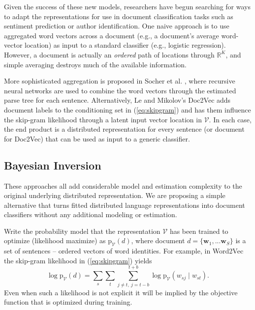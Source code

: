 \documentclass[11pt]{article}
\begin{document}
Given the success of these new models, researchers have begun searching for
ways to adapt the representations for use in document classification tasks
such as sentiment prediction or author identification.  One  naive approach is
to use aggregated word vectors across a document (e.g., a document's average
word-vector location) as input to a standard classifier (e.g.,
logistic regression).  However, a document is actually  an {\it ordered} path
of  locations through $\mathds{R}^K$, and simple averaging destroys much of the available
information.  

More sophisticated aggregation is proposed in Socher et al.
, where recursive neural
networks are used to combine the word vectors through the estimated parse tree
for each sentence.  Alternatively,  Le and Mikolov's Doc2Vec
 adds document labels to the conditioning set
in (\ref{eq:skipgram}) and has them influence the skip-gram likelihood through
a latent input vector location in $\mathcal{V}$. In each case, the end product
is a distributed representation for every sentence (or document for Doc2Vec)
that can be used as input to a generic classifier.

\subsection{Bayesian Inversion}

These approaches all add considerable model and estimation complexity to the
original underlying distributed representation.  We are proposing a
simple alternative that turns fitted distributed language representations into
document classifiers without any additional modeling or estimation.  

Write the probability model that the representation $\mathcal{V}$ has been
trained to optimize (likelihood maximize) as $\mathrm{p}_{ \mathcal{V}}(d )$,
where document $d = \{\mathbf{w}_1, ... \mathbf{w}_S\}$ is a set of sentences 
-- ordered vectors of word identities.  
For example, in Word2Vec the skip-gram likelihood in
(\ref{eq:skipgram}) yields
\begin{equation}\label{eq:fulllhd}
\log\mathrm{p}_{ \mathcal{V}}(d) = \sum_s \sum_{t} \sum_{j\neq t,~j=t-b}^{t+b} 
\log\mathrm{p}_{ \mathcal{V}}(w_{sj}\mid w_{st} ).
\end{equation}
Even when such a likelihood is not explicit it will be implied by the objective function that is optimized during training.
\end{document}
